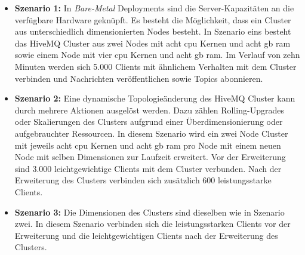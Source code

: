 \begin{itemize}
  \item \textbf{Szenario 1:} In \textit{Bare-Metal} Deployments sind die Server-Kapazitäten an die verfügbare Hardware geknüpft. Es besteht die Möglichkeit, dass ein Cluster aus unterschiedlich dimensionierten Nodes besteht. In Szenario eins besteht das HiveMQ Cluster aus zwei Nodes mit acht \ac{cpu} Kernen und acht \ac{gb} \ac{ram} sowie einem Node mit vier \ac{cpu} Kernen und acht \ac{gb} \ac{ram}. Im Verlauf von zehn Minuten werden sich 5.000 Clients mit ähnlichem Verhalten mit dem Cluster verbinden und Nachrichten veröffentlichen sowie Topics abonnieren.
  \item \textbf{Szenario 2:} Eine dynamische Topologieänderung des HiveMQ Cluster kann durch mehrere Aktionen ausgelöst werden. Dazu zählen Rolling-Upgrades oder Skalierungen des Clusters aufgrund einer Überdimensionierung oder aufgebrauchter Ressourcen. In diesem Szenario wird ein zwei Node Cluster mit jeweils acht \ac{cpu} Kernen und acht \ac{gb} \ac{ram} pro Node mit einem neuen Node mit selben Dimensionen zur Laufzeit erweitert. Vor der Erweiterung sind 3.000 leichtgewichtige Clients mit dem Cluster verbunden. Nach der Erweiterung des Clusters verbinden sich zusätzlich 600 leistungsstarke Clients.
  \item \textbf{Szenario 3:} Die Dimensionen des Clusters sind dieselben wie in Szenario zwei. In diesem Szenario verbinden sich die leistungsstarken Clients vor der Erweiterung und die leichtgewichtigen Clients nach der Erweiterung des Clusters.
\end{itemize}

